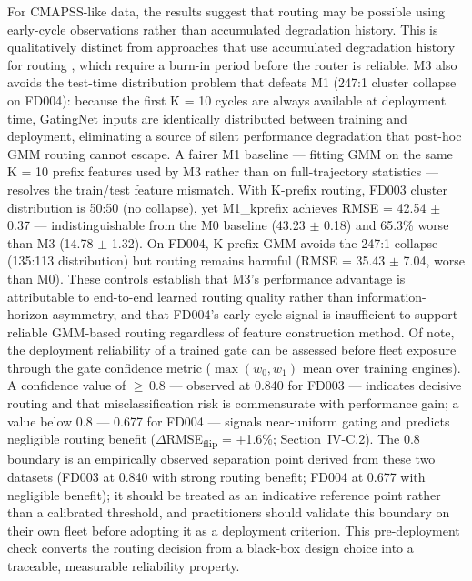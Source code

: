 \documentclass[review,12pt]{elsarticle}
\begin{document}
For CMAPSS-like data, the results suggest that routing may be possible using early-cycle observations rather than accumulated degradation history. This is qualitatively distinct from approaches that use accumulated degradation history for routing \cite{ref30,ref31,ref33}, which require a burn-in period before the router is reliable. M3 also avoids the test-time distribution problem that defeats M1 (247:1 cluster collapse on FD004): because the first K = 10 cycles are always available at deployment time, GatingNet inputs are identically distributed between training and deployment, eliminating a source of silent performance degradation that post-hoc GMM routing cannot escape. A fairer M1 baseline --- fitting GMM on the same K = 10 prefix features used by M3 rather than on full-trajectory statistics --- resolves the train/test feature mismatch. With K-prefix routing, FD003 cluster distribution is 50:50 (no collapse), yet M1\_kprefix achieves RMSE = 42.54 $\pm$ 0.37 --- indistinguishable from the M0 baseline (43.23 $\pm$ 0.18) and 65.3\% worse than M3 (14.78 $\pm$ 1.32). On FD004, K-prefix GMM avoids the 247:1 collapse (135:113 distribution) but routing remains harmful (RMSE = 35.43 $\pm$ 7.04, worse than M0). These controls establish that M3's performance advantage is attributable to end-to-end learned routing quality rather than information-horizon asymmetry, and that FD004's early-cycle signal is insufficient to support reliable GMM-based routing regardless of feature construction method. Of note, the deployment reliability of a trained gate can be assessed before fleet exposure through the gate confidence metric ($\max(w_0, w_1)$ mean over training engines). A confidence value of ${\geq}\,0.8$ --- observed at 0.840 for FD003 --- indicates decisive routing and that misclassification risk is commensurate with performance gain; a value below 0.8 --- 0.677 for FD004 --- signals near-uniform gating and predicts negligible routing benefit ($\Delta$RMSE\textsubscript{flip} = +1.6\%; Section~IV-C.2). The 0.8 boundary is an empirically observed separation point derived from these two datasets (FD003 at 0.840 with strong routing benefit; FD004 at 0.677 with negligible benefit); it should be treated as an indicative reference point rather than a calibrated threshold, and practitioners should validate this boundary on their own fleet before adopting it as a deployment criterion. This pre-deployment check converts the routing decision from a black-box design choice into a traceable, measurable reliability property.
\end{document}
